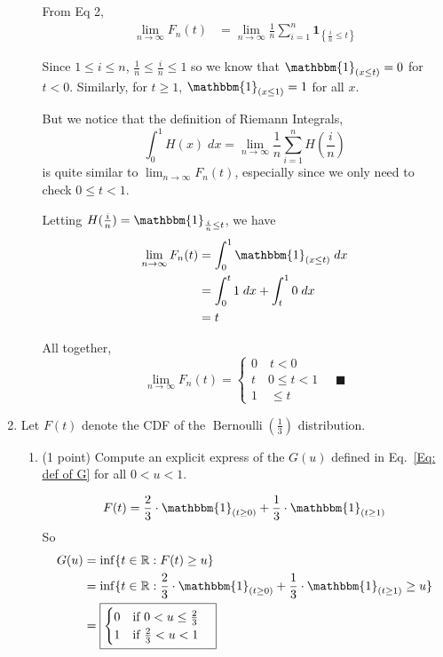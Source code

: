 \documentclass[11pt,letterpaper, leqno]{article}
\newcommand{\R}{\mathbb{R}}
\renewcommand{\qed}{\quad \blacksquare}
\newcommand{\ind}{\mathbbm{1}}
\begin{document}
\begin{enumerate}
\begin{enumerate}
\color{blue}
    From Eq 2,
    \begin{align*}
        \lim_{n\to \infty} F_n(t) &= \lim_{n\to \infty }\frac{1}{n}\sum_{i=1}^n\mathbf{1}_{\left\{\frac{i}{n} \le t\right\} }
    \end{align*}

    Since $1 \leq i \leq n$,  $\frac{1}{n} \leq \frac{i}{n} \leq 1$ so we know that $\ind_{(x \leq t)} = 0$ for $t < 0$. Similarly, for $t \geq 1$, $\ind_{(x \leq 1)} = 1$ for all $x$. 

    But we notice that the definition of Riemann Integrals,
    \[\int_{0}^{1} H(x)\; dx = \lim_{n\to\infty}\frac{1}{n}\sum_{i=1}^n H(\frac{i}{n})\]
    is quite similar to $\lim_{n\to\infty} F_n(t)$, especially since we only need to check $0 \leq t < 1$. 

    Letting $H(\frac{i}{n}) = \ind_{\frac{i}{n} \leq t}$, we have
    \begin{align*}
        \lim_{n\to \infty} F_n(t) &= \int_{0}^1 \ind_{(x \leq t)}\; dx\\
        &= \int_0^t 1\; dx + \int_t^1 0 \; dx\\ 
        &= t
    \end{align*}
    
    All together, 
    \[\lim_{n\to \infty} F_n(t) = \begin{cases}
        0 \quad t < 0\\ 
        t \quad 0 \leq t < 1\\ 
        1 \quad \leq t
    \end{cases} \qed\]
\color{black}

\end{enumerate}

\pagebreak
\item Let $F(t)$ denote the CDF of the $\operatorname{Bernoulli}(\frac{1}{3})$ distribution.
\begin{enumerate}
    \item (1 point) Compute an explicit express of the $G(u)$ defined in Eq.~\eqref{Eq: def of G} for all $0<u<1$.
    
    \color{blue}
        \[F(t) = \frac{2}{3} \cdot \ind_{(t \geq 0)} + \frac{1}{3}\cdot \ind_{(t \geq 1)}\]
        So 
        \begin{align*}
            G(u) &= \inf\{t\in \R : F(t) \geq u\}\\
            &= \inf\{t\in \R : \frac{2}{3} \cdot \ind_{(t \geq 0)} + \frac{1}{3}\cdot \ind_{(t \geq 1)} \geq u\}\\
            &= \boxed{\begin{cases}
                0 \quad \text{if } 0 < u \leq \frac{2}{3}\\
                1 \quad \text{if } \frac{2}{3} < u < 1
            \end{cases}}
        \end{align*}
    \color{black}


\end{enumerate}
\end{enumerate}
\end{document}
